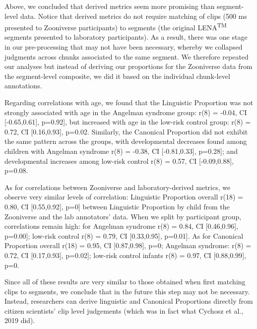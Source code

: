 \documentclass[english,,man,floatsintext]{apa6}
\begin{document}
Above, we concluded that derived metrics seem more promising than segment-level data. Notice that derived metrics do not require matching of clips (500 ms presented to Zooniverse participants) to segments (the original LENA\textsuperscript{TM} segments presented to laboratory participants). As a result, there was one stage in our pre-processing that may not have been necessary, whereby we collapsed judgments across chunks associated to the same segment. We therefore repeated our analyses but instead of deriving our proportions for the Zooniverse data from the segment-level composite, we did it based on the individual chunk-level annotations.

Regarding correlations with age, we found that the Linguistic Proportion was not strongly associated with age in the Angelman syndrome group: r(8) = -0.04, CI {[}-0.65,0.61{]}, p=0.92{]}, but increased with age in the low-risk control group: r(8) = 0.72, CI {[}0.16,0.93{]}, p=0.02. Similarly, the Canonical Proportion did not exhibit the same pattern across the groups, with developmental decreases found among children with Angelman syndrome r(8) = -0.38, CI {[}-0.81,0.33{]}, p=0.28{]}; and developmental increases among low-risk control r(8) = 0.57, CI {[}-0.09,0.88{]}, p=0.08.

As for correlations between Zooniverse and laboratory-derived metrics, we observe very similar levels of correlation: Linguistic Proportion overall r(18) = 0.80, CI {[}0.55,0.92{]}, p=0{]} between Linguistic Proportion by child from the Zooniverse and the lab annotators' data. When we split by participant group, correlations remain high: for Angelman syndrome r(8) = 0.84, CI {[}0.46,0.96{]}, p=0.00{]}; low-risk control r(8) = 0.79, CI {[}0.33,0.95{]}, p=0.01{]}. As for Canonical Proportion overall r(18) = 0.95, CI {[}0.87,0.98{]}, p=0; Angelman syndrome: r(8) = 0.72, CI {[}0.17,0.93{]}, p=0.02{]}; low-risk control infants r(8) = 0.97, CI {[}0.88,0.99{]}, p=0.

Since all of these results are very similar to those obtained when first matching clips to segments, we conclude that in the future this step may not be necessary. Instead, researchers can derive linguistic and Canonical Proportions directly from citizen scientists' clip level judgements (which was in fact what Cychosz et al., 2019 did).
\end{document}
